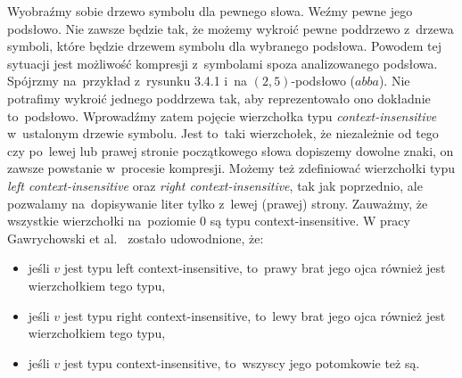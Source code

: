 \documentclass[declaration,shortabstract]{iithesis}
\theoremstyle{definition} \newtheorem{definition}{Definicja}[chapter]
\theoremstyle{plain} \newtheorem{remark}[definition]{Obserwacja}
\theoremstyle{plain} \newtheorem{theorem}[definition]{Twierdzenie}
\theoremstyle{plain} \newtheorem{example}{Przykład}[definition]
\theoremstyle{plain} \newtheorem{lemma}[definition]{Lemat}
\begin{document}
Wyobraźmy sobie drzewo symbolu dla pewnego słowa. Weźmy pewne jego podsłowo. Nie zawsze będzie tak, że możemy wykroić pewne poddrzewo z~drzewa symboli, które będzie drzewem symbolu dla wybranego podsłowa. Powodem tej sytuacji jest możliwość kompresji z~symbolami spoza analizowanego podsłowa. Spójrzmy na~przykład z~rysunku 3.4.1 i~na $(2, 5)$-podsłowo ($abba$). Nie potrafimy wykroić jednego poddrzewa tak, aby reprezentowało ono dokładnie to~podsłowo. Wprowadźmy zatem pojęcie wierzchołka typu \textit{context-insensitive} w~ustalonym drzewie symbolu. Jest to~taki wierzchołek, że niezależnie od tego czy po~lewej lub prawej stronie początkowego słowa dopiszemy dowolne znaki, on zawsze powstanie w~procesie kompresji. Możemy też zdefiniować wierzchołki typu \textit{left context-insensitive} oraz \textit{right context-insensitive}, tak jak poprzednio, ale pozwalamy na~dopisywanie liter tylko z~lewej (prawej) strony. Zauważmy, że wszystkie wierzchołki na~poziomie $0$ są typu context-insensitive. W pracy Gawrychowski et al.~\cite{gawrychowski} zostało udowodnione, że:
\begin{itemize}
    \item jeśli $v$ jest typu left context-insensitive, to~prawy brat jego ojca również jest wierzchołkiem tego typu,
    \item jeśli $v$ jest typu right context-insensitive, to~lewy brat jego ojca również jest wierzchołkiem tego typu,
    \item jeśli $v$ jest typu context-insensitive, to~wszyscy jego potomkowie też są.
\end{itemize}
\end{document}
